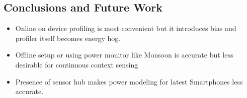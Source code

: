 \documentclass[a0,portrait]{a0poster}
\begin{document}
\begin{multicols}{2}
\section*{Conclusions and Future Work}
\color{DarkSlateGray} %
\begin{itemize}
\item Online on device profiling is most convenient but it introduces bias and profiler itself becomes energy hog.
\item Offline setup or using power monitor like Monsoon is accurate but less desirable for continuous context sensing
\item Presence of sensor hub makes power modeling for latest Smartphones less accurate. 
\end{itemize}

\color{DarkSlateGray} %



\color{SaddleBrown}

\end{multicols}
\end{document}
